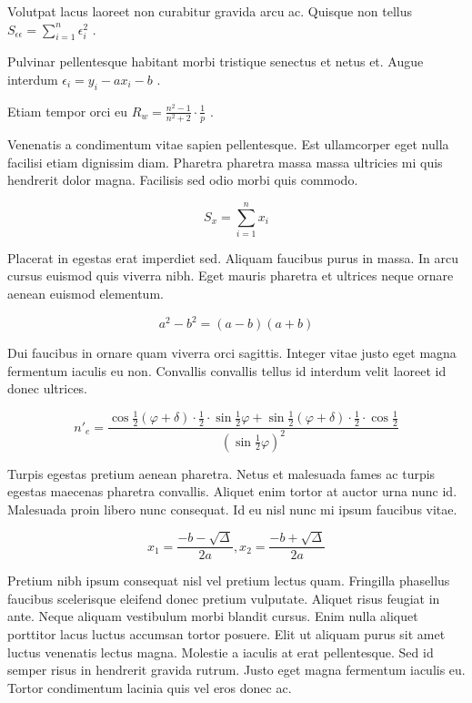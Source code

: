 \documentclass{article}
\begin{document}
Volutpat lacus laoreet non curabitur gravida arcu ac. Quisque non tellus 
\begin{math}
	S_{\epsilon \epsilon}=\sum_{i=1}^{n}\epsilon_i^2
\end{math}
.\newline

Pulvinar pellentesque habitant morbi tristique senectus et netus et. Augue interdum 
$ \epsilon_i=y_i-ax_i-b $
.\newline

Etiam tempor orci eu 
\( R_w=\frac{n^2-1}{n^2+2} \cdot \frac{1}{p} \)
.\newline

Venenatis a condimentum vitae sapien pellentesque. Est ullamcorper eget nulla facilisi etiam dignissim diam. Pharetra pharetra massa massa ultricies mi quis hendrerit dolor magna. Facilisis sed odio morbi quis commodo.

\[ S_x=\sum_{i=1}^{n}x_i \]

Placerat in egestas erat imperdiet sed. Aliquam faucibus purus in massa. In arcu cursus euismod quis viverra nibh. Eget mauris pharetra et ultrices neque ornare aenean euismod elementum.

$$ a^2-b^2=(a-b)(a+b) $$

Dui faucibus in ornare quam viverra orci sagittis. Integer vitae justo eget magna fermentum iaculis eu non. Convallis convallis tellus id interdum velit laoreet id donec ultrices. 

\begin{displaymath}
	n'_e=\frac{\cos \frac{1}{2}(\varphi +\delta)\cdot \frac{1}{2} \cdot \sin \frac{1}{2} \varphi + \sin \frac{1}{2}(\varphi +\delta)\cdot \frac{1}{2} \cdot \cos \frac{1}{2} }{(\sin \frac{1}{2}\varphi)^2}
\end{displaymath}

Turpis egestas pretium aenean pharetra. Netus et malesuada fames ac turpis egestas maecenas pharetra convallis. Aliquet enim tortor at auctor urna nunc id. Malesuada proin libero nunc consequat. Id eu nisl nunc mi ipsum faucibus vitae.

\begin{equation}
	x_1=\frac{-b-\sqrt{\Delta}}{2a},x_2=\frac{-b+\sqrt{\Delta}}{2a}
\end{equation}

Pretium nibh ipsum consequat nisl vel pretium lectus quam. Fringilla phasellus faucibus scelerisque eleifend donec pretium vulputate. Aliquet risus feugiat in ante. Neque aliquam vestibulum morbi blandit cursus. Enim nulla aliquet porttitor lacus luctus accumsan tortor posuere. Elit ut aliquam purus sit amet luctus venenatis lectus magna. Molestie a iaculis at erat pellentesque. Sed id semper risus in hendrerit gravida rutrum. Justo eget magna fermentum iaculis eu. Tortor condimentum lacinia quis vel eros donec ac.
\end{document}
